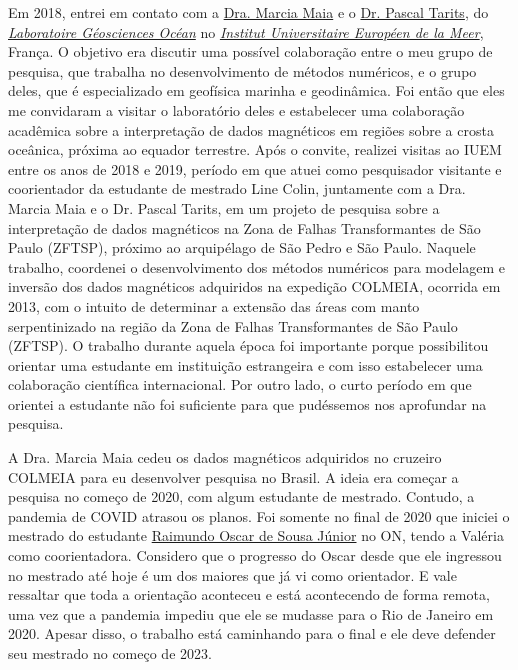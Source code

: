 Em 2018, entrei em contato com a 
\href{https://www-iuem.univ-brest.fr/lgo/equipe/maia-marcia-do-carmo/}{Dra. Marcia Maia} 
e o 
\href{https://www-iuem.univ-brest.fr/lgo/equipe/tarits-pascal/}{Dr. Pascal Tarits},
do 
\href{https://www-iuem.univ-brest.fr/lgo/le-labo/}{\textit{Laboratoire Géosciences Océan}} 
no \href{https://www-iuem.univ-brest.fr/}{\textit{Institut Universitaire Européen de la Meer}}, França. O objetivo era discutir uma possível colaboração entre o meu grupo de 
pesquisa, que trabalha no desenvolvimento de métodos numéricos, e o grupo deles,
que é especializado em geofísica marinha e geodinâmica.
Foi então que eles me convidaram a visitar o laboratório deles e estabelecer uma colaboração
acadêmica sobre a interpretação de dados magnéticos em regiões sobre a crosta oceânica,
próxima ao equador terrestre. Após o convite, realizei visitas ao IUEM entre os anos de
2018 e 2019, período em que atuei como pesquisador visitante e 
coorientador da estudante de mestrado Line Colin, juntamente
com a Dra. Marcia Maia e o Dr. Pascal Tarits, em um projeto de pesquisa sobre a 
interpretação de dados magnéticos na Zona de Falhas Transformantes de São
Paulo (ZFTSP), próximo ao arquipélago de São Pedro e São Paulo.
Naquele trabalho, coordenei o desenvolvimento dos métodos numéricos para modelagem
e inversão dos dados magnéticos adquiridos na expedição
COLMEIA, ocorrida em 2013, com o intuito de determinar a extensão das áreas com manto 
serpentinizado na região da Zona de Falhas Transformantes de São Paulo (ZFTSP). 
O trabalho durante aquela época foi importante porque possibilitou orientar uma
estudante em instituição estrangeira e com isso estabelecer uma colaboração científica
internacional. Por outro lado, o curto período em que orientei a estudante não foi
suficiente para que pudéssemos nos aprofundar na pesquisa. 

\bigskip

\noindent A Dra. Marcia Maia cedeu os dados magnéticos adquiridos no cruzeiro COLMEIA
para eu desenvolver pesquisa no Brasil. A ideia era começar a pesquisa no começo
de 2020, com algum estudante de mestrado. Contudo, a pandemia de COVID atrasou os planos.
Foi somente no final de 2020 que iniciei o mestrado do estudante
\href{https://lattes.cnpq.br/5355013713549584}{Raimundo Oscar de Sousa Júnior} no ON,
tendo a Valéria como coorientadora. Considero que o progresso do Oscar desde que 
ele ingressou no mestrado até hoje é um dos maiores que já vi como orientador.
E vale ressaltar que toda a orientação aconteceu e está acontecendo de forma remota,
uma vez que a pandemia impediu que ele se mudasse para o Rio de Janeiro em 2020.
Apesar disso, o trabalho está caminhando para o final e ele deve defender seu mestrado 
no começo de 2023.

